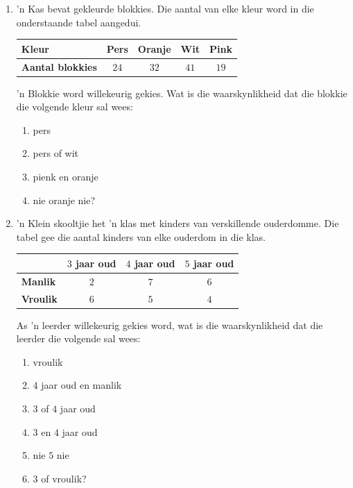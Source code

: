 \begin{exercises}{}
{
  \begin{enumerate}[itemsep=3pt, label=\textbf{\arabic*}.]
  \item  'n Kas bevat gekleurde blokkies. Die aantal van elke kleur word in die onderstaande tabel aangedui.

  \begin{center}
      \begin{tabular}{|l|c|c|c|c|}
        \hline
        \textbf{Kleur} & Pers & Oranje & Wit & Pink \\ \hline
       
        \textbf{Aantal blokkies} & $24$ & $32$ & $41$ & $19$ \\ \hline
   
      \end{tabular}
    \end{center}
    'n Blokkie word willekeurig gekies. Wat is die waarskynlikheid dat die blokkie die volgende kleur sal wees:
    \begin{enumerate}[noitemsep, label=\textbf{(\alph*)} ]
    \item pers
    \item pers of wit
    \item pienk en oranje
    \item nie oranje nie?
    \end{enumerate}

  \item 'n Klein skooltjie het 'n klas met kinders van verskillende ouderdomme. Die tabel gee die aantal kinders van elke ouderdom in die klas.

    \begin{center}
      \begin{tabular}{|l|c|c|c|}
        \hline
               & $3$ jaar oud & $4$ jaar oud & $5$ jaar oud \\\hline
   
        \textbf{Manlik}   & $2$ & $7$ & $6$ \\\hline
        \textbf{Vroulik} & $6$ & $5$ & $4$ \\\hline
       
      \end{tabular}
    \end{center}

    As 'n leerder willekeurig gekies word, wat is die waarskynlikheid dat die leerder die volgende sal wees:
    \begin{enumerate}[noitemsep, label=\textbf{(\alph*)} ]
    \item vroulik
    \item $4$ jaar oud en manlik 
    \item $3$ of $4$ jaar oud
    \item $3$ en $4$ jaar oud
    \item nie $5$ nie
    \item $3$ of vroulik?
    \end{enumerate}


\end{enumerate}}
\end{exercises}
